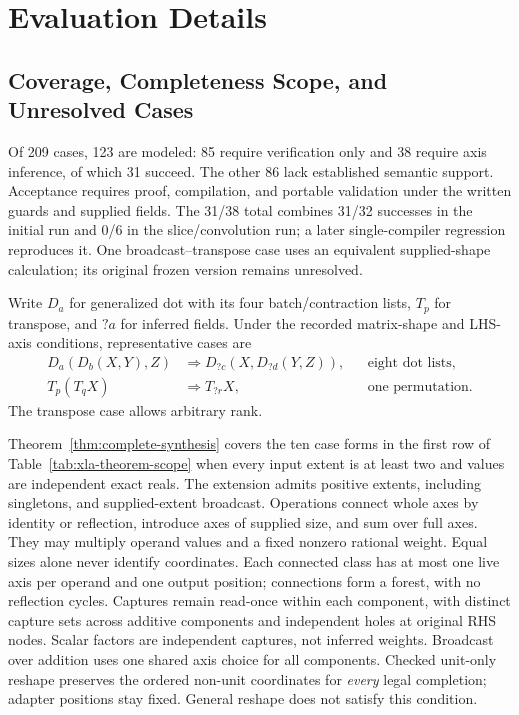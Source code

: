 \section{Evaluation Details}
\label{app:evaluation-details}
\subsection{Coverage, Completeness Scope, and Unresolved Cases}
\label{app:coverage-and-acceptance}
Of 209 cases, 123 are modeled: 85 require verification only and 38 require
axis inference, of which 31 succeed. The other 86 lack established semantic
support. Acceptance requires proof, compilation, and portable validation
under the written guards and supplied fields. The 31/38 total combines
31/32 successes in the initial run and 0/6 in the slice/convolution run;
a later single-compiler regression reproduces it. One broadcast--transpose
case uses an equivalent supplied-shape calculation; its original frozen
version remains unresolved.

Write $D_a$ for generalized dot with its four batch/contraction lists,
$T_p$ for transpose, and $?a$ for inferred fields. Under the recorded
matrix-shape and LHS-axis conditions, representative cases are
\begin{equation}
\begin{aligned}
 D_a(D_b(X,Y),Z)&\Rightarrow D_{?c}(X,D_{?d}(Y,Z)),
 &&\text{eight dot lists},\\
 T_p(T_qX)&\Rightarrow T_{?r}X,
 &&\text{one permutation}.
\end{aligned}
\end{equation}
The transpose case allows arbitrary rank.

Theorem~\ref{thm:complete-synthesis} covers the ten case forms in the first
row of Table~\ref{tab:xla-theorem-scope} when every input extent is at least
two and values are independent exact reals. The extension admits positive
extents, including singletons, and supplied-extent broadcast. Operations
connect whole axes by identity or reflection, introduce axes of supplied
size, and sum over full axes. They may multiply operand values and a fixed
nonzero rational weight. Equal sizes alone never identify coordinates.
Each connected class has at most one live axis per operand and one output
position; connections form a forest, with no reflection cycles.
Captures remain read-once within each component, with distinct capture sets
across additive components and independent holes at original RHS nodes.
Scalar factors are independent captures, not inferred weights.
Broadcast over addition uses one shared axis choice for all components.
Checked unit-only reshape preserves the ordered non-unit coordinates for
\emph{every} legal completion; adapter positions stay fixed. General reshape
does not satisfy this condition.

